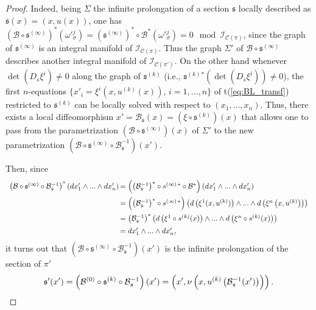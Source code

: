 \documentclass[12pt,english]{elsarticle}
\theoremstyle{plain}
\theoremstyle{plain}
\theoremstyle{remark}
\theoremstyle{plain}
\theoremstyle{definition}
\theoremstyle{definition}
\begin{document}
\begin{proof}
Indeed, being $\Sigma $ the infinite prolongation of a section
$\mathfrak{s}$ locally described as $\mathfrak{s}(x)=(x,u(x))$, one has
$\left (\mathcal{B}\circ \mathfrak{s}^{(\infty )}\right )^{*}(\omega '{}_{
\sigma}^{j})=
\allowbreak
\left (\mathfrak{s}^{(\infty )}\right )^{*}\circ \mathcal{B}^{*}
\left (\omega '{}_{\sigma}^{j}\right )
\allowbreak
=0\mod{\mathcal{I}_{\mathcal{C}(\pi )}}$, since the graph of
$\mathfrak{s}^{(\infty )}$ is an integral manifold of
$\mathcal{I}_{\mathcal{C}(\pi )}$. Thus the graph $\Sigma '$ of
$\mathcal{B}\circ \mathfrak{s}^{(\infty )}$ describes another integral manifold
of $\mathcal{I}_{\mathcal{C}(\pi ')}$. On the other hand whenever
$\det \left (D_{s}\xi ^{i}\right )\neq 0$ along the graph of
$\mathfrak{s}^{(k)}$ (i.e.,
$\mathfrak{s}^{(k)}{}^{*}\left (\det \left (D_{s}\xi ^{i}\right )
\right )\neq 0$), the first $n$-equations
$\{x'_{i}=\xi ^{i}(x,u^{(k)}(x)),\,i=1,...,n\}$ of t{(\ref{eq:BL_transf})}
restricted to $\mathfrak{s}^{(k)}$ can be locally solved with respect to
$(x_{1},...,x_{n})$. Thus, there exists a local diffeomorphism
$x'=\mathcal{B}_{\mathfrak{s}}(x)=\left (\xi \circ \mathfrak{s}^{(k)}
\right )(x)$ that allows one to pass from the parametrization
$\left (\mathcal{B}\circ \mathfrak{s}^{(\infty )}\right )(x)$ of
$\Sigma ' $ to the new parametrization $\left (\mathcal{B}
\circ \mathfrak{s}^{(\infty )}\circ \mathcal{B}_{\mathfrak{s}}^{-1}
\right )(x')$.

Then, since
%
\begin{equation*}
%
\begin{array}{l@{\,}l}
\left (\mathcal{B}\circ \mathfrak{s}^{(\infty )}\circ \mathcal{B}_{
\mathfrak{s}}^{-1}\right )^{*}\left (dx'_{1}\wedge ...\wedge dx'_{n}
\right ) & =\left(\left (\mathcal{B}_{\mathfrak{s}}^{-1}\right )^{*}\circ s^{(
\infty )\,*}\circ \mathcal{B}^{*}\right)\left (dx'_{1}\wedge ...\wedge dx'_{n}
\right )
\vspace{5pt}
\\
& =\left(\left (\mathcal{B}_{\mathfrak{s}}^{-1}\right )^{*}\circ s^{(
\infty )\,*}\right) \left (d\left (\xi ^{1}(x,u^{(k)})\right )\wedge ...
\wedge d\left (\xi ^{n}\left (x,u^{(k)}\right )\right )\right )
\vspace{5pt}
\\
& =\left (\mathcal{B}_{\mathfrak{s}}^{-1}\right )^{*} \left (d
\left (\xi ^{1}\circ s^{(k)}(x)\right )\wedge ...\wedge d\left (\xi ^{n}
\circ s^{(k)}(x)\right )\right )
\vspace{5pt}
\\
& =dx'_{1}\wedge ...\wedge dx'_{n},
\end{array}
%
\end{equation*}
%
it turns out that
$\left (\mathcal{B}\circ \mathfrak{s}^{(\infty )}\circ \mathcal{B}_{
\mathfrak{s}}^{-1}\right )(x')$ is the infinite prolongation of the section
of $\pi '$
%
\begin{equation*}
\mathfrak{s}'(x')=\left (\mathcal{B}^{(0)}\circ \mathfrak{s}^{(k)}
\circ \mathcal{B}_{\mathfrak{s}}^{-1}\right )(x')=\left (x',\nu
\left (x,u^{(k)}\left (\mathcal{B}_{\mathfrak{s}}^{-1}(x')\right )
\right )\right ).\qedhere
\end{equation*}
%
\end{proof}
\end{document}
